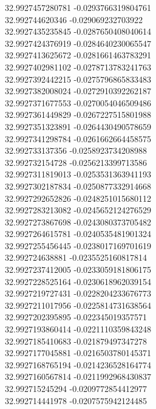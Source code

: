 {32.9927457280781	-0.0293766319804761\\
32.992744620346	-0.029069232703922\\
32.9927435235845	-0.0287650408040614\\
32.9927424376919	-0.0284640230065547\\
32.9927413625672	-0.0281661463783291\\
32.9927402981102	-0.0278713783241763\\
32.9927392442215	-0.0275796865833483\\
32.9927382008024	-0.0272910392262187\\
32.9927371677553	-0.0270054046509486\\
32.9927361449829	-0.0267227515801988\\
32.9927351323891	-0.0264430490578659\\
32.9927341298784	-0.0261662664458575\\
32.992733137356	-0.0258923734208988\\
32.992732154728	-0.0256213399713586\\
32.9927311819013	-0.0253531363941193\\
32.9927302187834	-0.0250877332914668\\
32.9927292652826	-0.0248251015680112\\
32.9927283213082	-0.0245652124276529\\
32.9927273867698	-0.0243080373705482\\
32.9927264615781	-0.0240535481901324\\
32.9927255456445	-0.0238017169701619\\
32.992724638881	-0.0235525160817814\\
32.9927237412005	-0.0233059181806175\\
32.9927228525164	-0.0230618962039154\\
32.9927219727431	-0.0228204233676773\\
32.9927211017956	-0.0225814731638564\\
32.9927202395895	-0.022345019357571\\
32.9927193860414	-0.0221110359843248\\
32.9927185410683	-0.021879497347278\\
32.9927177045881	-0.0216503780145371\\
32.9927168765194	-0.0214236528164774\\
32.9927160567814	-0.0211992968430837\\
32.992715245294	-0.0209772854412977\\
32.992714441978	-0.0207575942124485\\
}
